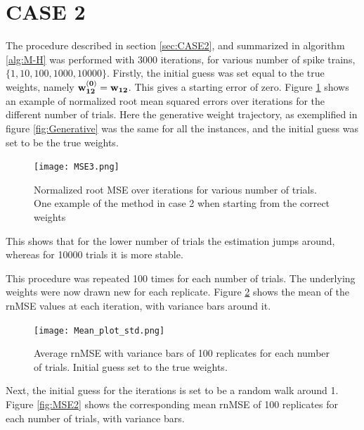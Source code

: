 \section{CASE 2}
\label{sec:CASE2_r}
The procedure described in section \ref{sec:CASE2}, and summarized in algorithm \ref{alg:M-H} was performed with 3000 iterations, for various number of spike trains, $ \{1,10,100,1000,10000 \}$. Firstly, the initial guess was set equal to the true weights, namely $\bf w_{12}^{(0)} = \bf w_{12}$. This gives a starting error of zero. Figure \ref{fig:Case2_1} shows an example of normalized root mean squared errors over iterations for the different number of trials. Here the generative weight trajectory, as exemplified in figure \ref{fig:Generative} was the same for all the instances, and the initial guess was set to be the true weights. 


\begin{figure}[hbt!]
\caption{Normalized root MSE over iterations for various number of trials. One example of the method in case 2 when starting from the correct weights}
\label{fig:Case2_1}
    \centering
    \texttt{[image: MSE3.png]}
\end{figure}

This shows that for the lower number of trials the estimation jumps around, whereas for 10000 trials it is more stable.

This procedure was repeated 100 times for each number of trials. The underlying weights were now drawn new for each replicate. Figure \ref{fig:case2_avg} shows the mean of the rnMSE values at each iteration, with variance bars around it. 

\begin{figure}[hbt!]
\caption{Average rnMSE with variance bars of 100 replicates for each number of trials. Initial guess set to the true weights.}
\label{fig:case2_avg}
    \centering
    \texttt{[image: Mean\_plot\_std.png]}
\end{figure}



Next, the initial guess for the iterations is set to be a random walk around 1. Figure \ref{fig:MSE2} shows the corresponding mean rnMSE of 100 replicates for each number of trials, with variance bars. 



